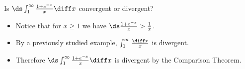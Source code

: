 \begin{frame}
\begin{example} %
Is $\ds \int_1^\infty \frac{1+e^{-x}}{x}\diff x$ convergent or divergent?

\begin{itemize}
\item<2->  Notice that for $ x\ge 1 $ we have $\ds \frac{1+e^{-x}}{x} > \frac{1}{x}$.
\item<3->  By a previously studied example, $\int_1^\infty \frac{\diff x}{x}$ is divergent.
\item<4->  Therefore $\ds \int_1^\infty \frac{1+e^{-x}}{x}\diff x$ is divergent by the Comparison Theorem.
\end{itemize}
\end{example}
\end{frame}
